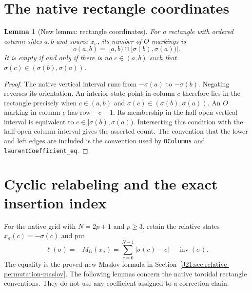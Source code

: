 \documentclass[11pt,oneside]{report}
\newtheorem{lemma}[theorem]{Lemma}
\theoremstyle{definition}
\numberwithin{equation}{section}
\newcommand{\decl}[1]{\textnormal{\nolinkurl{#1}}}
\begin{document}
\section{The native rectangle coordinates}
\begin{lemma}[New lemma: rectangle coordinates]
\label{J21:lem:torus-relative-rectangle}
For a rectangle with ordered column sides $a,b$ and source $x_\sigma$, its
number of $O$ markings is
\[
 o(a,b)=\bigl|[a,b)\cap[\sigma(b),\sigma(a))\bigr|.
\]
It is empty if and only if there is no $c\in(a,b)$ such that
$\sigma(c)\in(\sigma(b),\sigma(a))$.
\end{lemma}
\begin{proof}
The native vertical interval runs from $-\sigma(a)$ to $-\sigma(b)$.
Negating reverses its orientation. An interior state point in column $c$
therefore lies in the rectangle precisely when
$c\in(a,b)$ and $\sigma(c)\in(\sigma(b),\sigma(a))$.
An $O$ marking in column $c$ has row $-c-1$.
Its membership in the half-open vertical interval is equivalent to
$c\in[\sigma(b),\sigma(a))$. Intersecting this condition with the half-open
column interval gives the asserted count. The convention that the lower
and left edges are included is the convention used by
\decl{OColumns} and \decl{laurentCoefficient_eq}.
\end{proof}



\section{Cyclic relabeling and the exact insertion index}
\label{J21:sec:torus-insertion-geometry}

For the native grid with $N=2p+1$ and $p\geq3$, retain the relative
states $x_\sigma(c)=-\sigma(c)$ and put
\[
 \ell(\sigma)=-M_O(x_\sigma)
       =\sum_{c=0}^{N-1}|\sigma(c)-c|-\operatorname{inv}(\sigma).
 \tag{IG.1}
\]
The equality is the proved new Maslov formula in
Section~\ref{J21:sec:relative-permutation-maslov}.
The following lemmas concern the native toroidal rectangle conventions.
They do not use any coefficient assigned to a correction chain.
\end{document}
